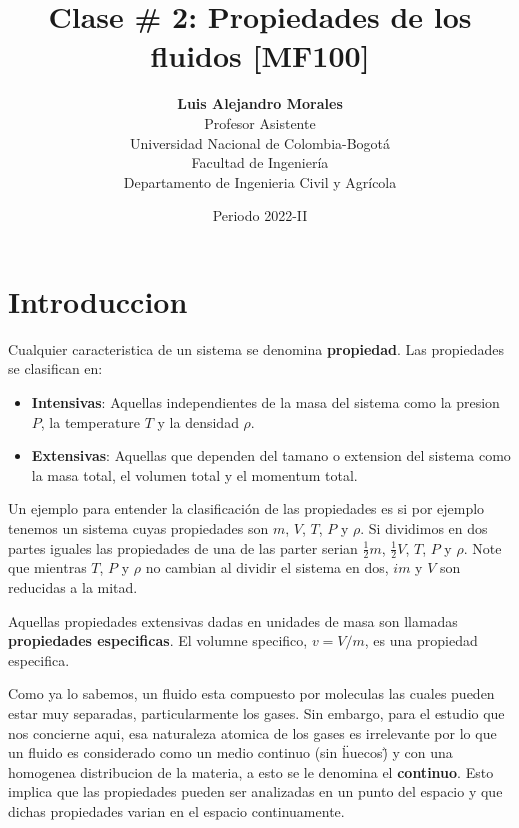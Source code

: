 \documentclass[10pt, oneside]{article}
\title{Clase \# 2: Propiedades de los fluidos [MF100]}
\author{\textbf{Luis Alejandro Morales}\\ \vspace{0.4cm} Profesor Asistente \\ Universidad Nacional de Colombia-Bogot\'a\\Facultad de Ingenier\'ia \\ Departamento de Ingenieria Civil y Agr\'icola}
\date{Periodo 2022-II}
\begin{document}
\maketitle
\tableofcontents

\vspace{.25in}

\section{Introduccion}
Cualquier caracteristica de un sistema se denomina \textbf{propiedad}. Las propiedades se clasifican en:
\begin{itemize}
\item \textbf{Intensivas}: Aquellas independientes de la masa del sistema como la presion $P$, la temperature $T$ y la densidad $\rho$.
\item \textbf{Extensivas}: Aquellas que dependen del tamano o extension del sistema como la masa total, el volumen total y el momentum total.
\end{itemize}
Un ejemplo para entender la clasificaci\'on de las propiedades es si por ejemplo tenemos un sistema cuyas propiedades son $m$, $V$, $T$, $P$ y $\rho$. Si dividimos en dos partes iguales las propiedades de una de las parter serian $\frac{1}{2}m$, $\frac{1}{2}V$, $T$, $P$ y $\rho$. Note que mientras $T$, $P$ y $\rho$ no cambian al dividir el sistema en dos, $im$ y $V$ son reducidas a la mitad.

Aquellas propiedades extensivas dadas en unidades de masa son llamadas \textbf{propiedades especificas}. El volumne specifico, $v=V/m$, es una propiedad especifica.

Como ya lo sabemos, un fluido esta compuesto por moleculas las cuales pueden estar muy separadas, particularmente los gases. Sin embargo, para el estudio que nos concierne aqui, esa naturaleza atomica de los gases es irrelevante por lo que un fluido es considerado como un medio continuo (sin \"huecos\") y con una homogenea distribucion de la materia, a esto se le denomina el \textbf{continuo}. Esto implica que las propiedades pueden ser analizadas en un punto del espacio y que dichas propiedades varian en el espacio continuamente. 
\end{document}

